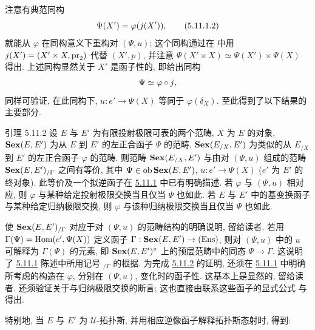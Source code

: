 注意有典范同构
\begin{equation*}
\Psi(X')=\varphi(j(X')){},\tag{5.11.1.2}
\end{equation*}
就能从 $\varphi$ 在同构意义下重构对 $(\Psi,u)$; 这个同构通过在  中用 $j(X')=(X'\times X,\operatorname{pr}_2)$ 代替 $(X',p)$, 并注意 $\Psi(X'\times X)\simeq\Psi(X')\times\Psi(X)$ 得出. 上述同构显然关于 $X'$ 是函子性的, 即给出同构
$$
\Psi\simeq \varphi\circ j{},
$$
同样可验证, 在此同构下, $u:e'\rightarrow\Psi(X)$ 等同于 $\varphi(\delta_X)$. 至此得到了以下结果的主要部分.

\begin{enonce*}{引理 5.11.2}
设 $E$ 与 $E'$ 为有限投射极限可表的两个范畴, $X$ 为 $E$ 的对象, $\operatorname{\mathbf{Sex}}(E,E')$ 为从 $E$ 到 $E'$ 的左正合函子 $\Psi$ 的范畴, $\operatorname{\mathbf{Sex}}(E_{/X},E')$ 为类似的从 $E_{/X}$ 到 $E'$ 的左正合函子 $\varphi$ 的范畴. 则范畴 $\operatorname{\mathbf{Sex}}(E_{/X},E')$ 与由对 $(\Psi,u)$ 组成的范畴 $\operatorname{\mathbf{Sex}}(E,E')_{/\Gamma}$ 之间有等价, 其中 $\Psi\in\operatorname{ob}\operatorname{\mathbf{Sex}}(E,E')$, $u:e'\rightarrow\Psi(X)$ ($e'$ 为 $E'$ 的终对象). 此等价及一个拟逆函子在 \hyperref[IV.subsubsec5.11.1]{5.11.1} 中已有明确描述. 若 $\varphi$ 与 $(\Psi,u)$ 相对应, 则 $\varphi$ 与某种给定投射极限交换\pageoriginale 当且仅当 $\Psi$ 也如此. 若 $E$ 与 $E'$ 中的基变换函子与某种给定归纳极限交换, 则 $\varphi$ 与该种归纳极限交换当且仅当 $\Psi$ 也如此.
\end{enonce*}

使 $\operatorname{\mathbf{Sex}}(E,E')_{/\Gamma}$ 对应于对 $(\Psi,u)$ 的范畴结构的明确说明, 留给读者. 若用 $\Gamma(\Psi)=\operatorname{Hom}(e',\Psi(X))$ 定义函子 $\Gamma:\operatorname{\mathbf{Sex}}(E,E')\rightarrow(\operatorname{Ens})$, 则对 $(\Psi,u)$ 中的 $u$ 可解释为 $\Gamma(\Psi)$ 的元素, 即 $\operatorname{\mathbf{Sex}}(E,E')^{\circ}$ 上的预层范畴中的同态 $\Psi\rightarrow\Gamma$. 这说明了 \hyperref[IV.subsubsec5.11.1]{5.11.1} 陈述中所用记号 ${}_{/\Gamma}$ 的根据. 为完成 \hyperref[IV.lem5.11.2]{5.11.2} 的证明, 还须在 \hyperref[IV.subsubsec5.11.1]{5.11.1} 中明确所考虑的构造在 $\varphi$, 分别在 $(\Psi,u)$, 变化时的函子性. 这基本上是显然的, 留给读者. 还须验证关于与归纳极限交换的断言; 这也直接由联系这些函子的显式公式  与  得出.

特别地, 当 $E$ 与 $E'$ 为 $𝒰$-拓扑斯, 并用相应逆像函子解释拓扑斯态射时, 得到:

